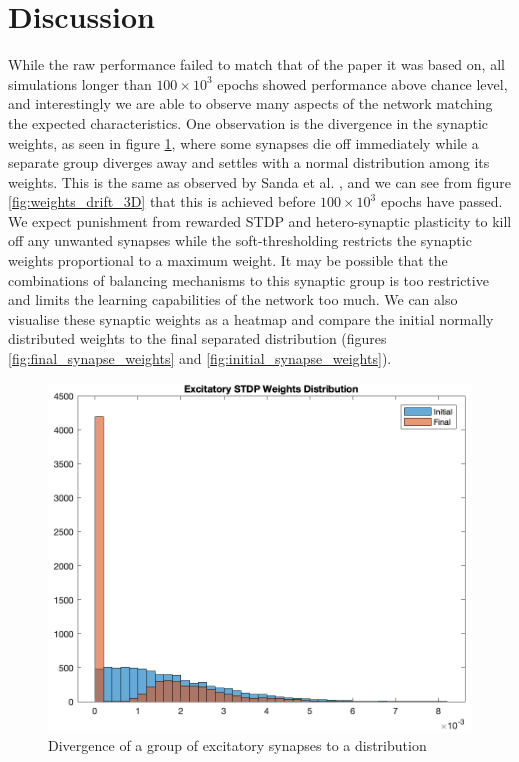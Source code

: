 \documentclass[11pt, twocolumn]{article}
\begin{document}
\section*{Discussion}
While the raw performance failed to match that of the paper it was based on, all simulations longer than $100\times10^3$ epochs showed performance above chance level, and interestingly we are able to observe many aspects of the network matching the expected characteristics. One observation is the divergence in the synaptic weights, as seen in figure \ref{fig:weights_drift_2D}, where some synapses die off immediately while a separate group diverges away and settles with a normal distribution among its weights. This is the same as observed by Sanda et al. \cite{sanda2017multi}, and we can see from figure \ref{fig:weights_drift_3D} that this is achieved before $100\times10^3$ epochs have passed. We expect punishment from rewarded \acs{STDP} and hetero-synaptic plasticity to kill off any unwanted synapses while the soft-thresholding restricts the synaptic weights proportional to a maximum weight. It may be possible that the combinations of balancing mechanisms to this synaptic group is too restrictive and limits the learning capabilities of the network too much. We can also visualise these synaptic weights as a heatmap and compare the initial normally distributed weights to the final separated distribution (figures \ref{fig:final_synapse_weights} and \ref{fig:initial_synapse_weights}).
\begin{figure}[H]
	\centering
	\includegraphics[width=\linewidth]{weights_drift_2D}
	\caption{Divergence of a group of excitatory synapses to a distribution}
	\label{fig:weights_drift_2D}
\end{figure}
\end{document}
